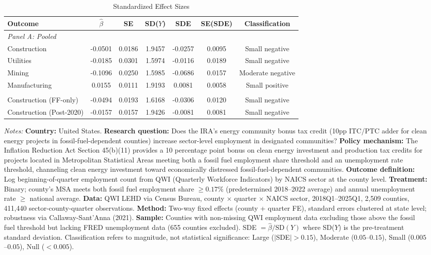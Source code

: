 \begin{table}[htbp]
\centering
\begin{threeparttable}
\caption{Standardized Effect Sizes}
\label{tab:sde}
\small
\begin{tabular}{lcccccc}
\toprule
Outcome & $\hat{\beta}$ & SE & SD($Y$) & SDE & SE(SDE) & Classification \\
\midrule
\multicolumn{7}{l}{\textit{Panel A: Pooled}} \\
\addlinespace
Construction & -0.0501 & 0.0186 & 1.9457 & -0.0257 & 0.0095 & Small negative \\
Utilities & -0.0185 & 0.0301 & 1.5974 & -0.0116 & 0.0189 & Small negative \\
Mining & -0.1096 & 0.0250 & 1.5985 & -0.0686 & 0.0157 & Moderate negative \\
Manufacturing & 0.0155 & 0.0111 & 1.9193 & 0.0081 & 0.0058 & Small positive \\
\addlinespace
\multicolumn{7}{l}{\textit{Panel B: Heterogeneous (Within Fossil Fuel Counties)}} \\
\addlinespace
Construction (FF-only) & -0.0494 & 0.0193 & 1.6168 & -0.0306 & 0.0120 & Small negative \\
Construction (Post-2020) & -0.0157 & 0.0157 & 1.9426 & -0.0081 & 0.0081 & Small negative \\
\bottomrule
\end{tabular}
\begin{tablenotes}[flushleft]\scriptsize
\item \textit{Notes:} \textbf{Country:} United States. \textbf{Research question:} Does the IRA's energy community bonus tax credit (10pp ITC/PTC adder for clean energy projects in fossil-fuel-dependent counties) increase sector-level employment in designated communities? \textbf{Policy mechanism:} The Inflation Reduction Act Section 45(b)(11) provides a 10 percentage point bonus on clean energy investment and production tax credits for projects located in Metropolitan Statistical Areas meeting both a fossil fuel employment share threshold and an unemployment rate threshold, channeling clean energy investment toward economically distressed fossil-fuel-dependent communities. \textbf{Outcome definition:} Log beginning-of-quarter employment count from QWI (Quarterly Workforce Indicators) by NAICS sector at the county level. \textbf{Treatment:} Binary; county's MSA meets both fossil fuel employment share $\geq 0.17\%$ (predetermined 2018--2022 average) and annual unemployment rate $\geq$ national average. \textbf{Data:} QWI LEHD via Census Bureau, county $\times$ quarter $\times$ NAICS sector, 2018Q1--2025Q1, 2,509 counties, 411,440 sector-county-quarter observations. \textbf{Method:} Two-way fixed effects (county + quarter FE), standard errors clustered at state level; robustness via Callaway-Sant'Anna (2021). \textbf{Sample:} Counties with non-missing QWI employment data excluding those above the fossil fuel threshold but lacking FRED unemployment data (655 counties excluded). SDE $= \hat{\beta} / \text{SD}(Y)$ where SD($Y$) is the pre-treatment standard deviation. Classification refers to magnitude, not statistical significance: Large ($|$SDE$| > 0.15$), Moderate ($0.05$--$0.15$), Small ($0.005$--$0.05$), Null ($< 0.005$).

\end{tablenotes}
\end{threeparttable}
\end{table}
